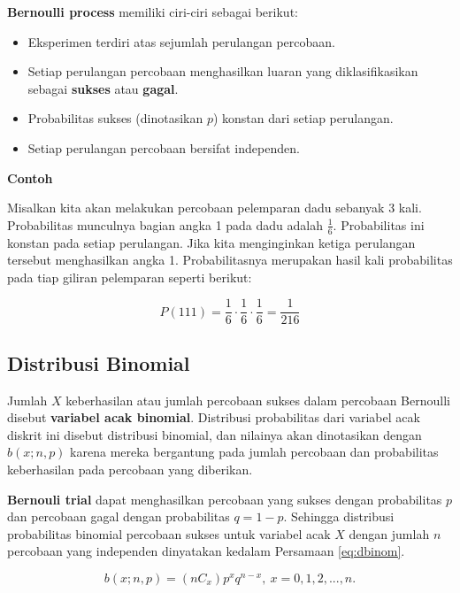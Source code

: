 \documentclass[]{book}
\providecommand{\tightlist}{%
  \setlength{\itemsep}{0pt}\setlength{\parskip}{0pt}}
\begin{document}
\textbf{Bernoulli process} memiliki ciri-ciri sebagai berikut:

\begin{itemize}
\tightlist
\item
  Eksperimen terdiri atas sejumlah perulangan percobaan.
\item
  Setiap perulangan percobaan menghasilkan luaran yang diklasifikasikan
  sebagai \textbf{sukses} atau \textbf{gagal}.
\item
  Probabilitas sukses (dinotasikan \(p\)) konstan dari setiap
  perulangan.
\item
  Setiap perulangan percobaan bersifat independen.
\end{itemize}

\textbf{Contoh}

Misalkan kita akan melakukan percobaan pelemparan dadu sebanyak 3 kali.
Probabilitas munculnya bagian angka 1 pada dadu adalah \(\frac{1}{6}\).
Probabilitas ini konstan pada setiap perulangan. Jika kita menginginkan
ketiga perulangan tersebut menghasilkan angka 1. Probabilitasnya
merupakan hasil kali probabilitas pada tiap giliran pelemparan seperti
berikut:

\[
P\left(111\right)=\frac{1}{6}\cdot\frac{1}{6}\cdot\frac{1}{6}=\frac{1}{216}
\]

\subsection{Distribusi Binomial}\label{distribusi-binomial}

Jumlah \(X\) keberhasilan atau jumlah percobaan sukses dalam percobaan
Bernoulli disebut \textbf{variabel acak binomial}. Distribusi
probabilitas dari variabel acak diskrit ini disebut distribusi binomial,
dan nilainya akan dinotasikan dengan \(b\left(x;n,p\right)\) karena
mereka bergantung pada jumlah percobaan dan probabilitas keberhasilan
pada percobaan yang diberikan.

\textbf{Bernouli trial} dapat menghasilkan percobaan yang sukses dengan
probabilitas \(p\) dan percobaan gagal dengan probabilitas \(q=1-p\).
Sehingga distribusi probabilitas binomial percobaan sukses untuk
variabel acak \(X\) dengan jumlah \(n\) percobaan yang independen
dinyatakan kedalam Persamaan \eqref{eq:dbinom}.

\begin{equation}
   b\left(x;n,p\right)=\left(nC_x\right)p^xq^{n-x},\ x=0,1,2,...,n.
  \label{eq:dbinom}
\end{equation}
\end{document}
